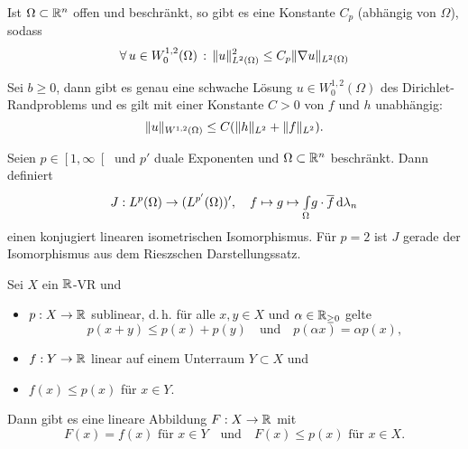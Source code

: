 \documentclass{cheat-sheet}
\begin{document}
\begin{lem}
  Ist $\Omega \subset \mathbb{R}^n$ offen und beschränkt, so gibt es eine Konstante $C_p$ (abhängig von $\Omega$), sodass
  \[ \forall \, {u \in W_0^{1,2}(\Omega)} \,:\, \lVert u\rVert_{L^2(\Omega)}^2 \leq C_p \lVert\nabla u\rVert_{L^2(\Omega)} \]
\end{lem}

\begin{satz}
  Sei $b \geq 0$, dann gibt es genau eine schwache Lösung $u \in W_0^{1,2}(\Omega)$ des Dirichlet-Randproblems und es gilt mit einer Konstante $C > 0$ von $f$ und $h$ unabhängig:
  \[ \lVert u\rVert_{W^{1,2}(\Omega)} \leq C (\lVert h\rVert_{L^2} + \lVert f\rVert_{L^2}). \]
\end{satz}



\begin{satz}
  Seien $p \in \left[ 1, \infty \right[$ und $p'$ duale Exponenten und $\Omega \subset \mathbb{R}^n$ beschränkt. Dann definiert
  \[ J : L^p(\Omega) \to (L^{p'}(\Omega))', \quad f \mapsto g \mapsto {\textstyle \int\limits_{\Omega}^{}} g \cdot \overline{f} \,\mathrm{d} \lambda_n \]
  einen konjugiert linearen isometrischen Isomorphismus. Für $p=2$ ist $J$ gerade der Isomorphismus aus dem Rieszschen Darstellungssatz.
\end{satz}





\begin{samepage}
\begin{satz}
  Sei $X$ ein $\mathbb{R}$-VR und
  \begin{itemize}
    \item $p : X \to \mathbb{R}$ sublinear, d.\,h. für alle $x, y \in X$ und $\alpha \in \mathbb{R}_{\geq 0}$ gelte
    \[ p(x+y) \leq p(x) + p(y) \quad \text{und} \quad p(\alpha x) = \alpha p(x), \]
    \item $f : Y \to \mathbb{R}$ linear auf einem Unterraum $Y \subset X$ und
    \item $f(x) \leq p(x)$ für $x \in Y$.
  \end{itemize}
  Dann gibt es eine lineare Abbildung $F : X \to \mathbb{R}$ mit
  \[ F(x) = f(x) \text{ für $x \in Y$} \quad \text{und} \quad F(x) \leq p(x) \text{ für } x \in X. \]
\end{satz}
\end{samepage}
\end{document}

